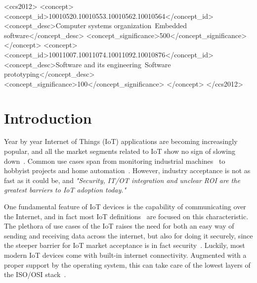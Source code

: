 \documentclass[manuscript,screen]{acmart}
\begin{document}
\begin{CCSXML}
<ccs2012>
<concept>
<concept_id>10010520.10010553.10010562.10010564</concept_id>
<concept_desc>Computer systems organization~Embedded software</concept_desc>
<concept_significance>500</concept_significance>
</concept>
<concept>
<concept_id>10011007.10011074.10011092.10010876</concept_id>
<concept_desc>Software and its engineering~Software prototyping</concept_desc>
<concept_significance>100</concept_significance>
</concept>
</ccs2012>
\end{CCSXML}



\maketitle


\section{Introduction}

Year by year Internet of Things (IoT) applications are becoming increasingly popular, and all the market segments related to IoT show no sign of slowing down~\cite{columbus2017roundup}. 
Common use cases span from monitoring industrial machines~\cite{albano2019mantis} to hobbyist projects and home automation~\cite{javed2016building}. 
However, industry acceptance is not as fast as it could be, and {\em "Security, IT/OT integration and unclear ROI are the greatest barriers to IoT adoption today."}~\cite{columbus2018roundup}


One fundamental feature of IoT devices is the capability of communicating over the Internet, and in fact most IoT definitions~\cite{berte2018defining} are focused on this characteristic. 
%
The plethora of use cases of the IoT raises the need for both an easy way of sending and receiving data across the internet, but also for doing it securely, since the steeper barrier for IoT market acceptance is in fact security~\cite{columbus2018roundup}. 
%
Luckily, most modern IoT devices come with built-in internet connectivity. Augmented with a proper support by the operating system, this can take care of the lowest layers of the ISO/OSI stack~\cite{palattella2012standardized}. 
\end{document}
